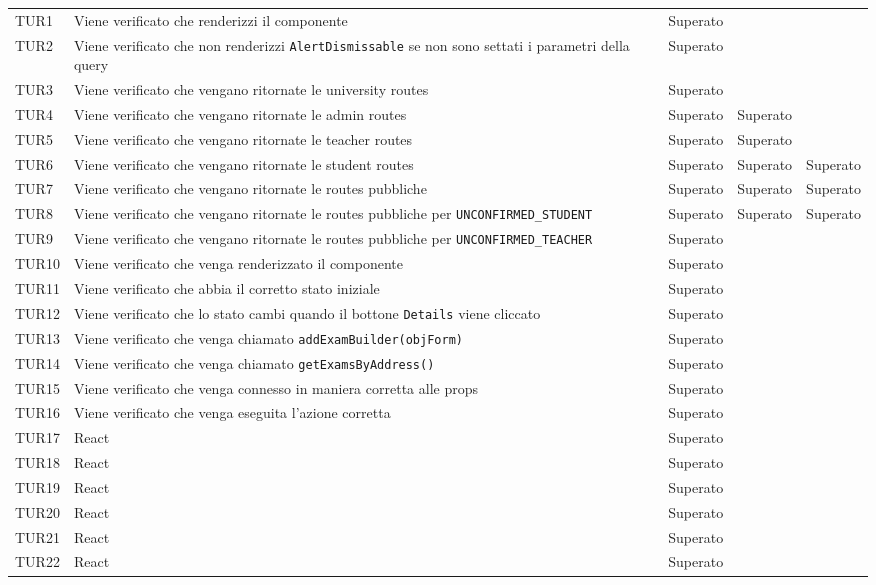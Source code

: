\documentclass[PianoDiQualifica.tex]{subfiles}
\begin{document}
\begin{longtable}[H]{P{2cm}P{8.5cm}P{3cm}}
	\hhline{===}
	TUR1 & Viene verificato che renderizzi il componente & Superato \\ 
	TUR2 & Viene verificato che non renderizzi \texttt{AlertDismissable} se non sono settati i parametri della query & Superato \\ 
	TUR3 & Viene verificato che vengano ritornate le university routes  & Superato \\ 
	TUR4 & Viene verificato che vengano ritornate le admin routes  & Superato & Superato \\ 
	TUR5 & Viene verificato che vengano ritornate le teacher routes  & Superato & Superato \\ 
	TUR6 & Viene verificato che vengano ritornate le student routes  & Superato & Superato & Superato \\ 
	TUR7 & Viene verificato che vengano ritornate le routes pubbliche & Superato & Superato & Superato \\ 
	TUR8 & Viene verificato che vengano ritornate le routes pubbliche per \texttt{UNCONFIRMED\_STUDENT} & Superato & Superato & Superato \\ 
	TUR9 & Viene verificato che vengano ritornate le routes pubbliche per \texttt{UNCONFIRMED\_TEACHER} & Superato \\ 
	TUR10 & Viene verificato che venga renderizzato il componente & Superato \\ 
	TUR11 & Viene verificato che abbia il corretto stato iniziale & Superato \\ 
	TUR12 & Viene verificato che lo stato cambi quando il bottone \texttt{Details} viene cliccato & Superato \\ 
	TUR13 & Viene verificato che venga chiamato \texttt{addExamBuilder(objForm)} & Superato \\ 
	TUR14 & Viene verificato che venga chiamato \texttt{getExamsByAddress()} & Superato \\ 
	TUR15 & Viene verificato che venga connesso in maniera corretta alle props & Superato \\ 
	TUR16 & Viene verificato che venga eseguita l'azione corretta & Superato \\ 
	TUR17 & React & Superato \\ 
	TUR18 & React & Superato \\ 
	TUR19 & React & Superato \\ 
	TUR20 & React & Superato \\ 
	TUR21 & React & Superato \\ 
	TUR22 & React & Superato \\ 

\end{longtable}
\end{document}
